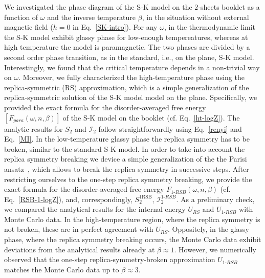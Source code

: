 \documentclass[twocolumn,superscriptaddress,prb,10pt]{revtex4-1}
\begin{document}
We investigated the phase diagram of the S-K model on the $2$-sheets booklet as a function 
of $\omega$ and the inverse temperature $\beta$, in the situation without external 
magnetic field ($h=0$ in Eq.~\eqref{SK-intro}). For any $\omega$, in the 
thermodynamic limit the S-K model exhibit glassy phase for low-enough tempereatures, 
whereas at high temperature the model is paramagnetic. The two phases are divided 
by a second order phase transition, as in the standard, i.e., on the plane, S-K model. 
Interestingly, we found that the critical temperature depends in a non-trivial 
way on $\omega$. Moreover, we fully characterized the high-temperature phase 
using the replica-symmetric (RS) approximation, which is a simple generalization 
of the replica-symmetric solution of the S-K model model on the plane. Specifically, 
we provided the exact formula for the disorder-averaged free energy $[F_{para}(\omega,n,
\beta)]$ of the S-K model on the booklet (cf. Eq.~\eqref{ht-logZ}). The analytic results 
for $S_2$ and ${\mathcal I}_2$ follow straightforwardly using Eq.~\eqref{renyi} and 
Eq.~\eqref{MI}. In the low-temperature glassy phase the replica symmetry has to be 
broken, similar to the standard S-K model. In order to take into account the 
replica symmetry breaking we device a simple generalization of the the Parisi 
ansatz~\cite{parisi-1980}, which allows to break the replica symmetry in successive 
steps. After restricting ourselves to the one-step replica symmetry breaking, we 
provide the exact formula for the disorder-averaged free energy $F_{1\textrm{-}RSB}
(\omega,n,\beta)$ (cf. Eq.~\eqref{RSB-1-logZ}), and, correspondingly, $S_2^{1\textrm{RSB}}$, 
${\mathcal I}_2^{1\textrm{-}RSB}$. As a preliminary check, we compared the analytical 
results for the internal energy $U_{RS}$ and $U_{1\textrm{-}RSB}$ with Monte Carlo data. 
In the high-temperature region, where the replica symmetry is not broken, these are 
in perfect agreement with $U_{RS}$. Oppositely, in the glassy phase, where the replica 
symmetry breaking occurs, the Monte Carlo data exhibit deviations from the analytical 
results already at $\beta\approx 1$. However, we numerically observed that the one-step 
replica-symmetry-broken approximation $U_{1\textrm{-}RSB}$ matches the Monte Carlo 
data up to $\beta\approx 3$. 
\end{document}
